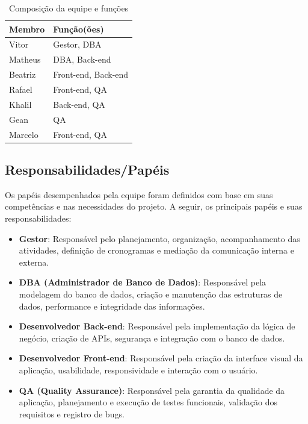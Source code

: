 \documentclass[
	12pt,				%
	openany,			%
	twoside,			%
	a4paper,			%
	english,			%
	brazil				%
	]{abntex2}
\begin{document}
\begin{table}[htbp] 
\centering
\begin{tabular}{|l|l|}
\hline
\textbf{Membro} & \textbf{Função(ões)} \\ \hline
Vitor           & Gestor, DBA           \\ \hline
Matheus         & DBA, Back-end         \\ \hline
Beatriz         & Front-end, Back-end   \\ \hline
Rafael          & Front-end, QA         \\ \hline
Khalil              & Back-end, QA          \\ \hline
Gean            & QA                    \\ \hline
Marcelo         & Front-end, QA         \\ \hline
\end{tabular}
\caption{Composição da equipe e funções}
\end{table}


\subsection{Responsabilidades/Papéis}

Os papéis desempenhados pela equipe foram definidos com base em suas competências e nas necessidades do projeto. A seguir, os principais papéis e suas responsabilidades:

\begin{itemize}
    \item \textbf{Gestor}: Responsável pelo planejamento, organização, acompanhamento das atividades, definição de cronogramas e mediação da comunicação interna e externa.
    \item \textbf{DBA (Administrador de Banco de Dados)}: Responsável pela modelagem do banco de dados, criação e manutenção das estruturas de dados, performance e integridade das informações.
    \item \textbf{Desenvolvedor Back-end}: Responsável pela implementação da lógica de negócio, criação de APIs, segurança e integração com o banco de dados.
    \item \textbf{Desenvolvedor Front-end}: Responsável pela criação da interface visual da aplicação, usabilidade, responsividade e interação com o usuário.
    \item \textbf{QA (Quality Assurance)}: Responsável pela garantia da qualidade da aplicação, planejamento e execução de testes funcionais, validação dos requisitos e registro de bugs.
\end{itemize}
\end{document}
